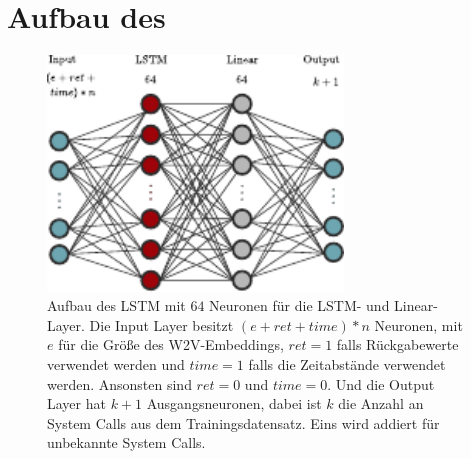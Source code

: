     \section{Aufbau des }\label{sec:aufbau_lstm}
        \begin{figure}[ht]
            \centering
            \includegraphics[width=0.7\textwidth]{images/lstm.pdf}
            \caption[Aufbau des \ac{LSTM}]{Aufbau des \ac{LSTM} mit $64$ Neuronen für die \ac{LSTM}- und Linear-Layer.
                Die Input Layer besitzt $(e + ret + time) * n$ Neuronen, mit $e$ für die Größe des \ac{W2V}-Embeddings,
                $ret=1$ falls Rückgabewerte verwendet werden und $time=1$ falls die Zeitabstände verwendet werden.
                Ansonsten sind $ret=0$ und $time=0$.
                Und die Output Layer hat $k+1$ Ausgangsneuronen, dabei ist $k$ die Anzahl an System Calls aus dem Trainingsdatensatz.
                Eins wird addiert für unbekannte System Calls.}
                \label{fig:lstm}
        \end{figure}

